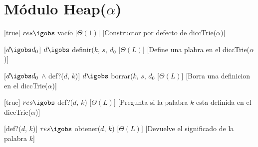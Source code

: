 \section{M\'{o}dulo Heap($\alpha$)}

\begin{Interfaz}
  
  \begin{paramFormales}
    \paramGeneros{$\alpha$}

    

  \end{paramFormales}




    [true]
    {$res \igobs$ vac\'{i}o}
    [$\Theta(1)$]
    [Constructor por defecto de diccTrie($\alpha$)]

    [$d \igobs d_{0}$]
    {$d \igobs$ definir($k$, $s$, $d_{0}$}
    [$\Theta(L)$]
    [Define una plabra en el diccTrie($\alpha$)]

    [$d \igobs d_{0}$ $\land$ def?($d$, $k$)]
    {$d \igobs$ borrar($k$, $s$, $d_{0}$}
    [$\Theta(L)$]
    [Borra una definicion en el diccTrie($\alpha$)]

    [true]
    {$res \igobs$ def?($d$, $k$)}
    [$\Theta(L)$]
    [Pregunta si la palabra $k$ esta definida en el diccTrie($\alpha$)]

    [def?($d$, $k$)]
    {$res \igobs$ obtener($d$, $k$)}
    [$\Theta(L)$]
    [Devuelve el significado de la palabra $k$]

\end{Interfaz}
